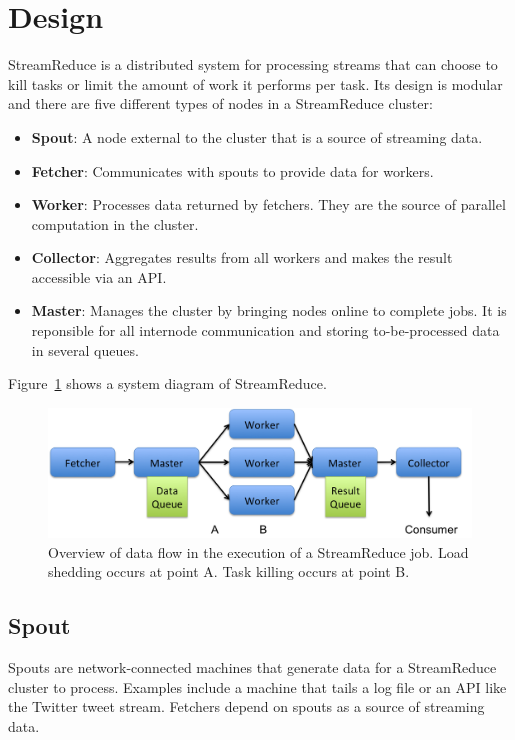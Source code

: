 \documentclass[12pt,twocolumn]{article}
\begin{document}
\section{Design}
\label{sec:design}
StreamReduce is a distributed system for processing streams that can choose to kill tasks or
limit the amount of work it performs per task. Its design is modular and there are five
different types of nodes in a StreamReduce cluster:
\begin{itemize}
  \item
    \textbf{Spout}: A node external to the cluster that is a source of streaming data.
  \item
    \textbf{Fetcher}: Communicates with spouts to provide data for workers.
  \item
    \textbf{Worker}: Processes data returned by fetchers. They are the source of parallel computation
    in the cluster.
  \item
    \textbf{Collector}: Aggregates results from all workers and makes the result accessible via an API.
  \item
    \textbf{Master}: Manages the cluster by bringing nodes online to complete jobs. It is reponsible
    for all internode communication and storing to-be-processed data in several queues.
\end{itemize}
Figure~\ref{fig:systemdiagram} shows a system diagram of StreamReduce.

\begin{figure}
\includegraphics[width=\textwidth]{system-diagram.png}
\caption{Overview of data flow in the execution of a StreamReduce job. Load shedding occurs at point A. Task killing occurs at point B.}
\label{fig:systemdiagram}
\end{figure}

\subsection{Spout}
Spouts are network-connected machines that generate data for a StreamReduce cluster to process.
Examples include a machine that tails a log file or an API like the Twitter tweet
stream. Fetchers depend on spouts as a source of streaming data.
\end{document}

